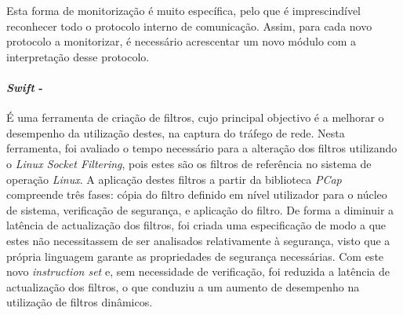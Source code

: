 Esta forma de monitorização é muito específica, pelo que é imprescindível reconhecer todo o protocolo interno de comunicação.
Assim, para cada novo protocolo a monitorizar, é necessário acrescentar um novo módulo com a interpretação desse protocolo.


\paragraph*{\textit{Swift} - }
É uma ferramenta de criação de filtros, cujo principal objectivo é a melhorar o desempenho da utilização destes, na captura do tráfego de rede.
Nesta ferramenta, foi avaliado o tempo necessário para a alteração dos filtros utilizando o \textit{Linux Socket Filtering}, pois estes são os filtros de referência no sistema de operação \textit{Linux}.
A aplicação destes filtros a partir da biblioteca \textit{PCap} compreende três fases: cópia do filtro definido em nível utilizador para o núcleo de sistema, verificação de segurança, e aplicação do filtro.
De forma a diminuir a latência de actualização dos filtros, foi criada uma especificação de modo a que estes não necessitassem de ser analisados relativamente à segurança, visto que a própria linguagem garante as propriedades de segurança necessárias.
Com este novo \textit{instruction set} e, sem necessidade de verificação, foi reduzida a latência de actualização dos filtros, o que conduziu a um aumento de desempenho na utilização de filtros dinâmicos.










